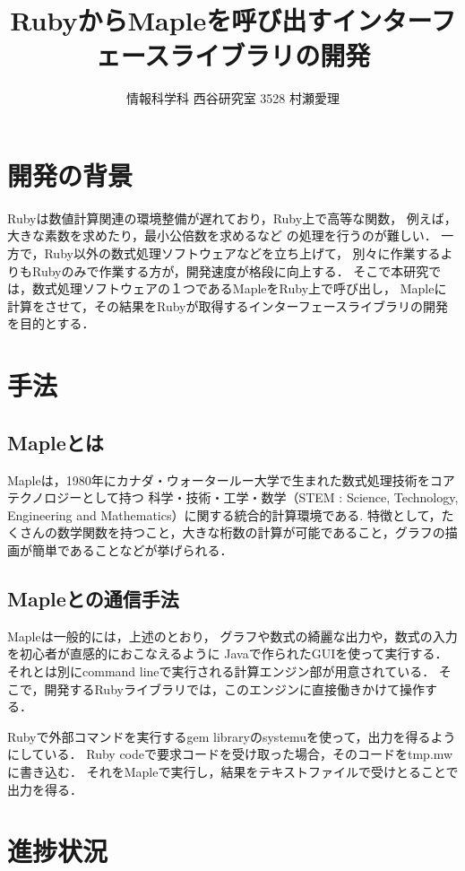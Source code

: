 \documentclass[10pt,a4j,twocolumn]{jsarticle}
\begin{document}
\title{RubyからMapleを呼び出すインターフェースライブラリの開発}
\author{情報科学科 西谷研究室 3528 村瀬愛理}
\date{}
\maketitle
\section{開発の背景}
Rubyは数値計算関連の環境整備が遅れており，Ruby上で高等な関数，
例えば，大きな素数を求めたり，最小公倍数を求めるなど
の処理を行うのが難しい．
一方で，Ruby以外の数式処理ソフトウェアなどを立ち上げて，
別々に作業するよりもRubyのみで作業する方が，開発速度が格段に向上する．
そこで本研究では，数式処理ソフトウェアの１つであるMapleをRuby上で呼び出し，
Mapleに計算をさせて，その結果をRubyが取得するインターフェースライブラリの開発を目的とする．

\section{手法}
\subsection{Mapleとは}
Mapleは，1980年にカナダ・ウォータールー大学で生まれた数式処理技術をコアテクノロジーとして持つ
科学・技術・工学・数学（STEM : Science, Technology, Engineering and Mathematics）に関する統合的計算環境である\cite{Maple}.
特徴として，たくさんの数学関数を持つこと，大きな桁数の計算が可能であること，グラフの描画が簡単であることなどが挙げられる．

\subsection{Mapleとの通信手法}
Mapleは一般的には，上述のとおり，
グラフや数式の綺麗な出力や，数式の入力を初心者が直感的におこなえるように
Javaで作られたGUIを使って実行する．
それとは別にcommand lineで実行される計算エンジン部が用意されている．
そこで，開発するRubyライブラリでは，このエンジンに直接働きかけて操作する．

Rubyで外部コマンドを実行するgem libraryのsystemuを使って，出力を得るようにしている．
Ruby codeで要求コードを受け取った場合，そのコードをtmp.mwに書き込む．
それをMapleで実行し，結果をテキストファイルで受けとることで出力を得る．

\section{進捗状況}
\end{document}

